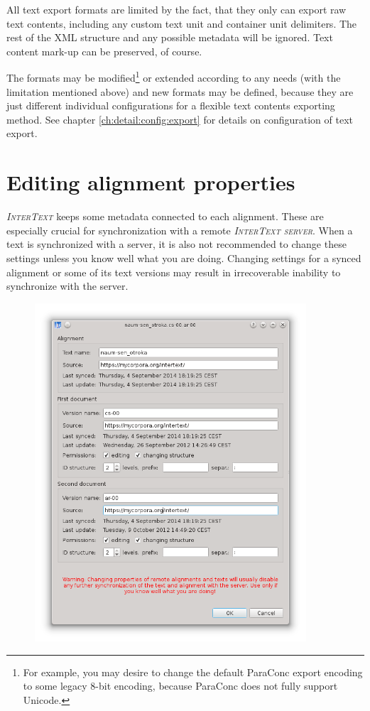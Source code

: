 \documentclass[a4paper,10pt,oneside]{book}
\newcommand{\IT}{\textit{\textsc{InterText}}\xspace}
\newcommand{\ITserver}{\textit{\textsc{InterText server}}\xspace}
\begin{document}
All text export formats are limited by the fact, that they only can export raw text contents, including any custom text unit and container unit delimiters. The rest of the XML structure and any possible metadata will be ignored. Text content mark-up can be preserved, of course.

The formats may be modified\footnote{For example, you may desire to change the default ParaConc export encoding to some legacy 8-bit encoding, because ParaConc does not fully support Unicode.} or extended according to any needs (with the limitation mentioned above) and new formats may be defined, because they are just different individual configurations for a flexible text contents exporting method. See chapter \ref{ch:detail:config:export} for details on configuration of text export.

\section{Editing alignment properties}\label{ch:detail:managing_local:properties}

\IT keeps some metadata connected to each alignment. These are especially crucial for synchronization with a remote \ITserver. When a text is synchronized with a server, it is also not recommended to change these settings unless you know well what you are doing. Changing settings for a synced alignment or some of its text versions may result in irrecoverable inability to synchronize with the server.

\begin{figure}[htb]
 \includegraphics[width=0.9\textwidth]{screenshots/properties.png}
\end{figure}
\end{document}
